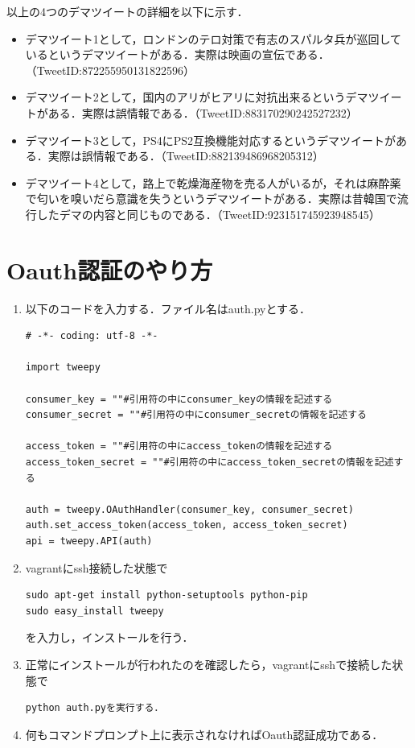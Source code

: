 以上の4つのデマツイートの詳細を以下に示す．
\begin{itemize}
 \item デマツイート1として，ロンドンのテロ対策で有志のスパルタ兵が巡回しているというデマツイートがある．実際は映画の宣伝である．（TweetID:872255950131822596）
 \item デマツイート2として，国内のアリがヒアリに対抗出来るというデマツイートがある．実際は誤情報である．（TweetID:883170290242527232）
 \item デマツイート3として，PS4にPS2互換機能対応するというデマツイートがある．実際は誤情報である．（TweetID:882139486968205312）
 \item デマツイート4として，路上で乾燥海産物を売る人がいるが，それは麻酔薬で匂いを嗅いだら意識を失うというデマツイートがある．実際は昔韓国で流行したデマの内容と同じものである．（TweetID:923151745923948545）
\end{itemize}



\section{Oauth認証のやり方}
\begin{enumerate}
\item 以下のコードを入力する．ファイル名はauth.pyとする．
\begin{verbatim}
# -*- coding: utf-8 -*-

import tweepy

consumer_key = ""#引用符の中にconsumer_keyの情報を記述する
consumer_secret = ""#引用符の中にconsumer_secretの情報を記述する

access_token = ""#引用符の中にaccess_tokenの情報を記述する
access_token_secret = ""#引用符の中にaccess_token_secretの情報を記述する

auth = tweepy.OAuthHandler(consumer_key, consumer_secret)
auth.set_access_token(access_token, access_token_secret)
api = tweepy.API(auth)
\end{verbatim}
\item vagrantにssh接続した状態で
\begin{verbatim}
sudo apt-get install python-setuptools python-pip
sudo easy_install tweepy
\end{verbatim}
を入力し，インストールを行う．
\item 正常にインストールが行われたのを確認したら，vagrantにsshで接続した状態で
\begin{verbatim}
python auth.pyを実行する．
\end{verbatim}
\item 何もコマンドプロンプト上に表示されなければOauth認証成功である．
\end{enumerate}

